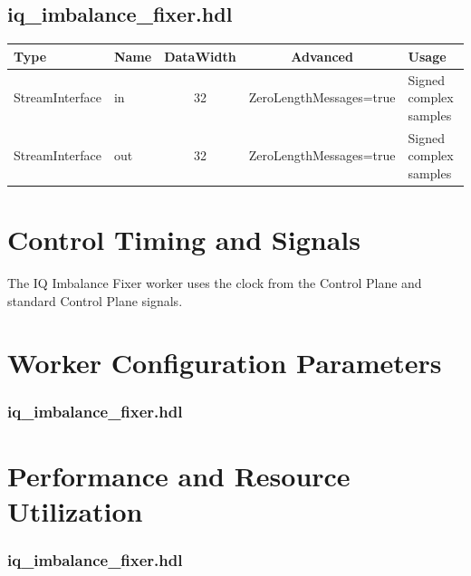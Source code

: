 \documentclass{article}
\def\comp{iq\_imbalance\_fixer}
\edef\ecomp{iq_imbalance_fixer}
\begin{document}
\begin{landscape}
		\subsection*{\comp.hdl}
		\begin{scriptsize}
			\begin{tabular}{|M{2cm}|M{1.5cm}|c|c|M{12cm}|}
				\hline
				Type            & Name & DataWidth & Advanced                & Usage                  \\
				\hline
				StreamInterface & in   & 32        & ZeroLengthMessages=true & Signed complex samples \\
				\hline
				StreamInterface & out  & 32        & ZeroLengthMessages=true & Signed complex samples \\
				\hline
			\end{tabular}
		\end{scriptsize}
	\end{landscape}

	\section*{Control Timing and Signals}
	\begin{flushleft}
		The IQ Imbalance Fixer worker uses the clock from the Control Plane and standard Control Plane signals.
	\end{flushleft}

\begin{landscape}
\section*{Worker Configuration Parameters}
\subsubsection*{\comp.hdl}

\section*{Performance and Resource Utilization}
\subsubsection*{\comp.hdl}

\end{landscape}
\end{document}
